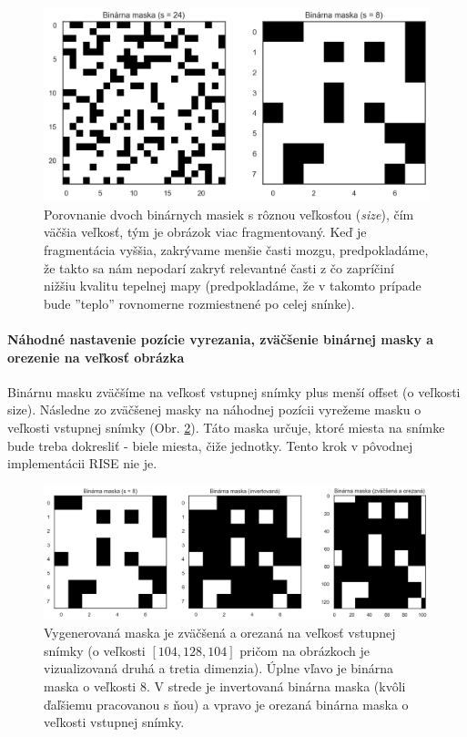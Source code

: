 \begin{figure}[h!]
    \centering
    \includegraphics[width=13cm]{assets/images/binary_mask.png}
    \caption{Porovnanie dvoch binárnych masiek s rôznou veľkosťou (\textit{size}), čím väčšia veľkosť, tým je obrázok viac fragmentovaný. Keď je fragmentácia vyššia, zakrývame menšie časti mozgu, predpokladáme, že takto sa nám nepodarí zakryť relevantné časti z čo zapríčiní nižšiu kvalitu tepelnej mapy (predpokladáme, že v takomto prípade bude ''teplo'' rovnomerne rozmiestnené po celej snínke).}
    \label{fig:binary_mask}
\end{figure}

\paragraph{Náhodné nastavenie pozície vyrezania, zväčšenie binárnej masky a orezenie na veľkosť obrázka}

Binárnu masku zväčšíme na veľkosť vstupnej snímky plus menší offset (o veľkosti size). Následne zo zväčšenej masky na náhodnej pozícii vyrežeme masku o veľkosti vstupnej snímky (Obr. \ref{fig:binary_mask_resized}). Táto maska určuje, ktoré miesta na snímke bude treba dokresliť - biele miesta, čiže jednotky. Tento krok v pôvodnej implementácii RISE nie je.

\begin{figure}[h!]
    \centering
    \includegraphics[width=13cm]{assets/images/binary_mask_resized.png}
    \caption{Vygenerovaná maska je zväčšená a orezaná na veľkosť vstupnej snímky (o veľkosti $[104, 128, 104]$ pričom na obrázkoch je vizualizovaná druhá a tretia dimenzia). Úplne vľavo je binárna maska o veľkosti $8$. V strede je invertovaná binárna maska (kvôli ďaľšiemu pracovanou s ňou) a vpravo je orezaná binárna maska o veľkosti vstupnej snímky.}
    \label{fig:binary_mask_resized}
\end{figure}

